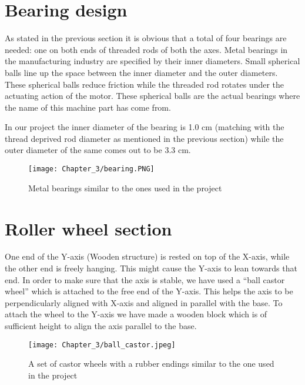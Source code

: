 

\section{Bearing design}

As stated in the previous section it is obvious that a total of four bearings are needed: one on both ends of threaded rods of both the axes. Metal bearings in the manufacturing industry are specified by their inner diameters. Small spherical balls line up the space between the inner diameter and the outer diameters. These spherical balls reduce friction while the threaded rod rotates under the actuating action of the motor. These spherical balls are the actual bearings where the name of this machine part has come from. \par

In our project the inner diameter of the bearing is 1.0 cm (matching with the thread deprived rod diameter as mentioned in the previous section) while the outer diameter of the same comes out to be 3.3 cm. 

\begin{figure}[h]
    \centering
    \texttt{[image: Chapter\_3/bearing.PNG]}
    \caption{Metal bearings similar to the ones used in the project}
    \label{fig:bearing}
\end{figure}

\section{Roller wheel section}

One end of the Y-axis (Wooden structure) is rested on top of the X-axis, while the other end is freely hanging. This might cause the Y-axis to lean towards that end. In order to make sure that the axis is stable, we have used a “ball castor wheel” which is attached to the free end of the Y-axis. This helps the axis to be perpendicularly aligned with X-axis and aligned in parallel with the base. To attach the wheel to the Y-axis we have made a wooden block which is of sufficient height to align the axis parallel to the base.

\begin{figure}[h]
    \centering
    \texttt{[image: Chapter\_3/ball\_castor.jpeg]}
    \caption{A set of castor wheels with a rubber endings similar to the one used in the project}
    \label{fig:ballcastor}
\end{figure}

